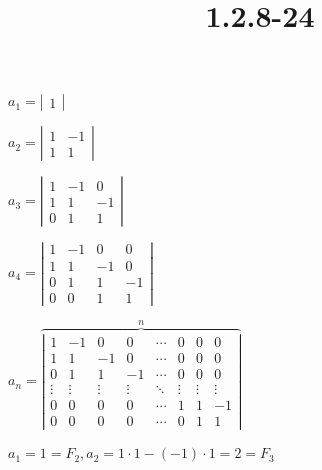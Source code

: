 \documentclass{article}
\title{1.2.8-24}
\begin{document}
\maketitle

\( a_1 = \left|\begin{matrix}1\end{matrix}\right| \)

\( a_2 = \left|\begin{matrix}1 & -1 \\ 1 & 1\end{matrix}\right| \)

\( a_3 = \left|\begin{matrix}1 & -1 & 0 \\ 1 & 1 & -1 \\ 0 & 1 & 1\end{matrix}\right| \)

\( a_4 = \left|\begin{matrix}1 & -1 & 0 & 0\\ 1 & 1 & -1 & 0\\ 0 & 1 & 1 & -1 \\ 0 & 0 & 1 & 1\end{matrix}\right| \)

\( a_n = \overbrace{\left|\begin{matrix}1 & -1 & 0 & 0 & \cdots & 0 & 0 & 0 \\ 1 & 1 & -1 & 0 & \cdots & 0 & 0 & 0 \\ 0 & 1 & 1 & -1 & \cdots & 0 & 0 & 0 \\ \vdots & \vdots & \vdots & \vdots & \ddots & \vdots & \vdots & \vdots \\ 0 & 0 & 0 & 0 & \cdots & 1 & 1 & -1 \\ 0 & 0 & 0 & 0 & \cdots & 0 & 1 & 1\end{matrix}\right|}^n \)

\( a_1 = 1 = F_2, a_2 = 1 \cdot 1 - (-1) \cdot 1 = 2 = F_3 \)
\end{document}
